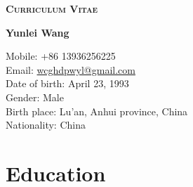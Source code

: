\documentclass[11pt]{article} %
\begin{document}

\begin{center}
{\huge \bfseries\scshape Curriculum Vitae}
\end{center}
\vspace{0.05\textheight}
{\LARGE\bfseries Yunlei Wang}%
\bigskip %


\vspace{0.01\textheight} 

Mobile: +86 13936256225\\ %
Email: \href{wcghdpwyl@gmail.com}{wcghdpwyl@gmail.com}\\%
\vspace{0.01\textheight}%
Date of birth: April 23, 1993\\
Gender: Male\\
Birth place: Lu'an, Anhui province, China\\ %
Nationality: China\hfill {} %


\section*{Education}
\end{document}

